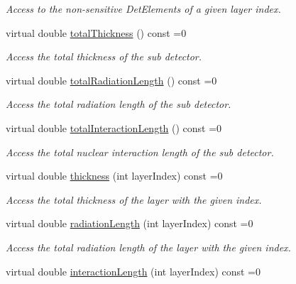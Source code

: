 \begin{DoxyCompactItemize}
\begin{DoxyCompactList}\small\item\em Access to the non-\/sensitive Det\+Elements of a given layer index. \end{DoxyCompactList}\item 
virtual double \hyperlink{class_d_d4hep_1_1_d_d_rec_1_1_layering_extension_a287dd58b108f5d121bc55c91009454ed}{total\+Thickness} () const =0
\begin{DoxyCompactList}\small\item\em Access the total thickness of the sub detector. \end{DoxyCompactList}\item 
virtual double \hyperlink{class_d_d4hep_1_1_d_d_rec_1_1_layering_extension_a710dca345926458ed3ab3abc06490ee9}{total\+Radiation\+Length} () const =0
\begin{DoxyCompactList}\small\item\em Access the total radiation length of the sub detector. \end{DoxyCompactList}\item 
virtual double \hyperlink{class_d_d4hep_1_1_d_d_rec_1_1_layering_extension_aa5440bf9dc11305a785765ca155437fa}{total\+Interaction\+Length} () const =0
\begin{DoxyCompactList}\small\item\em Access the total nuclear interaction length of the sub detector. \end{DoxyCompactList}\item 
virtual double \hyperlink{class_d_d4hep_1_1_d_d_rec_1_1_layering_extension_a6510f43f195374e6adfb4312c27da450}{thickness} (int layer\+Index) const =0
\begin{DoxyCompactList}\small\item\em Access the total thickness of the layer with the given index. \end{DoxyCompactList}\item 
virtual double \hyperlink{class_d_d4hep_1_1_d_d_rec_1_1_layering_extension_adf915de4949eb6f0406045b4b38dd469}{radiation\+Length} (int layer\+Index) const =0
\begin{DoxyCompactList}\small\item\em Access the total radiation length of the layer with the given index. \end{DoxyCompactList}\item 
virtual double \hyperlink{class_d_d4hep_1_1_d_d_rec_1_1_layering_extension_aa7959c9c384c0f5ffcd066c5dc01514f}{interaction\+Length} (int layer\+Index) const =0

\end{DoxyCompactItemize}
